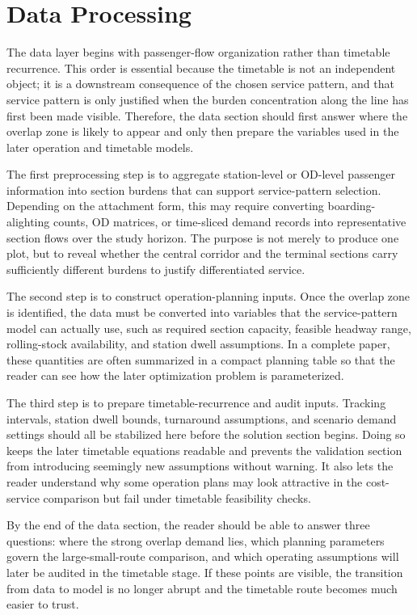 \section{Data Processing}

The data layer begins with passenger-flow organization rather than timetable recurrence. This order is essential because the timetable is not an independent object; it is a downstream consequence of the chosen service pattern, and that service pattern is only justified when the burden concentration along the line has first been made visible. Therefore, the data section should first answer where the overlap zone is likely to appear and only then prepare the variables used in the later operation and timetable models.

The first preprocessing step is to aggregate station-level or OD-level passenger information into section burdens that can support service-pattern selection. Depending on the attachment form, this may require converting boarding-alighting counts, OD matrices, or time-sliced demand records into representative section flows over the study horizon. The purpose is not merely to produce one plot, but to reveal whether the central corridor and the terminal sections carry sufficiently different burdens to justify differentiated service.

The second step is to construct operation-planning inputs. Once the overlap zone is identified, the data must be converted into variables that the service-pattern model can actually use, such as required section capacity, feasible headway range, rolling-stock availability, and station dwell assumptions. In a complete paper, these quantities are often summarized in a compact planning table so that the reader can see how the later optimization problem is parameterized.

The third step is to prepare timetable-recurrence and audit inputs. Tracking intervals, station dwell bounds, turnaround assumptions, and scenario demand settings should all be stabilized here before the solution section begins. Doing so keeps the later timetable equations readable and prevents the validation section from introducing seemingly new assumptions without warning. It also lets the reader understand why some operation plans may look attractive in the cost-service comparison but fail under timetable feasibility checks.

By the end of the data section, the reader should be able to answer three questions: where the strong overlap demand lies, which planning parameters govern the large-small-route comparison, and which operating assumptions will later be audited in the timetable stage. If these points are visible, the transition from data to model is no longer abrupt and the timetable route becomes much easier to trust.
